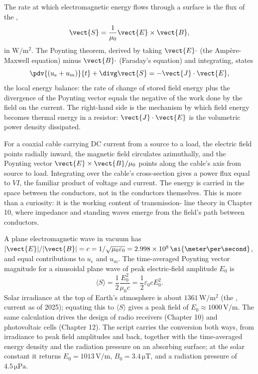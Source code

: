 

The rate at which electromagnetic energy flows through a surface is the
flux of the ,
\[
\vect{S} = \frac{1}{\mu_{0}}\vect{E}\times \vect{B},
\]
in $\si{\watt\per\meter\squared}$. The Poynting theorem, derived by
taking $\vect{E}\cdot$ (the Amp\`ere-Maxwell equation) minus
$\vect{B}\cdot$ (Faraday's equation) and integrating, states
\[
\pdv{(u_{e}+u_{m})}{t} + \divg \vect{S} = -\vect{J}\cdot \vect{E},
\]
the local energy balance: the rate of change of stored field energy
plus the divergence of the Poynting vector equals the negative of the
work done by the field on the current. The right-hand side is the
mechanism by which field energy becomes thermal energy in a resistor:
$\vect{J}\cdot \vect{E}$ is the volumetric power density dissipated.

\begin{principle}
For a coaxial cable carrying DC current from a source to a load, the
electric field points radially inward, the magnetic field circulates
azimuthally, and the Poynting vector $\vect{E}\times \vect{B}/\mu_{0}$
points along the cable's axis from source to load. Integrating over
the cable's cross-section gives a power flux equal to $VI$, the
familiar product of voltage and current. The energy is carried in the
space between the conductors, not in the conductors themselves. This
is more than a curiosity: it is the working content of transmission-
line theory in Chapter 10, where impedance and standing waves emerge
from the field's path between conductors.
\end{principle}

A plane electromagnetic wave in vacuum has $|\vect{E}|/|\vect{B}| = c
= 1/\sqrt{\mu_{0}\varepsilon_{0}} = 2.998\times 10^{8}\,\si{\meter\per
\second}$, and equal contributions to $u_{e}$ and $u_{m}$. The
time-averaged Poynting vector magnitude for a sinusoidal plane wave
of peak electric-field amplitude $E_{0}$ is
\[
\langle S\rangle = \frac{1}{2}\frac{E_{0}^{2}}{\mu_{0} c} =
\frac{1}{2}\varepsilon_{0} c E_{0}^{2}.
\]
Solar irradiance at the top of Earth's atmosphere is about $1361\,\si{
\watt\per\meter\squared}$ (the , current as
of 2025); equating this to $\langle S\rangle$ gives a peak field of
$E_{0} \approx 1000\,\si{\volt\per\meter}$. The same calculation drives
the design of radio receivers (Chapter 10) and photovoltaic cells
(Chapter 12). The script  carries the
conversion both ways, from irradiance to peak field amplitudes and back,
together with the time-averaged energy density and the radiation
pressure on an absorbing surface; at the solar constant it returns
$E_{0} = 1013\,\si{\volt\per\meter}$, $B_{0} = 3.4\,\si{\micro\tesla}$,
and a radiation pressure of $4.5\,\si{\micro\pascal}$.

